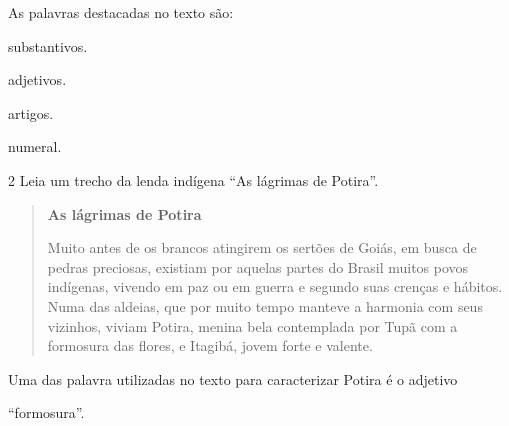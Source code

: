 \begin{escolha}
\begin{escolha}
\begin{escolha}
{As palavras destacadas no texto são:

\begin{escolha}
\item substantivos.

\item adjetivos.

\item artigos.

\item numeral.
\end{escolha}


\num{2} Leia um trecho da lenda indígena ``As lágrimas de Potira''.

\begin{quote}
\textbf{As lágrimas de Potira}

Muito antes de os brancos atingirem os sertões de Goiás, em busca de
pedras preciosas, existiam por aquelas partes do Brasil muitos povos
indígenas, vivendo em paz ou em guerra e segundo suas crenças e hábitos.
Numa das aldeias, que por muito tempo manteve a harmonia com seus
vizinhos, viviam Potira, menina bela contemplada por Tupã com a formosura das
flores, e Itagibá, jovem forte e valente. 
\end{quote}


Uma das palavra utilizadas no texto para caracterizar Potira é o adjetivo

\begin{escolha}
\item ``formosura''.


\end{escolha}}
\end{escolha}
\end{escolha}
\end{escolha}
